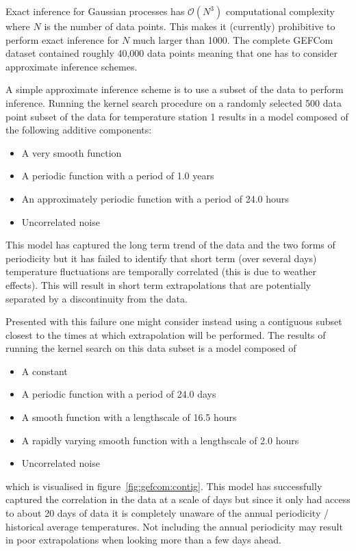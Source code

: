 Exact inference for Gaussian processes has $\mathcal{O}(N^3)$  computational complexity where $N$ is the number of data points.
This makes it (currently) prohibitive to perform exact inference for $N$ much larger than 1000.
The complete GEFCom dataset contained roughly 40,000 data points meaning that one has to consider approximate inference schemes.

A simple approximate inference scheme is to use a subset of the data to perform inference\citep[e.g.][]{Quinonero-Candela2005-er}.
Running the kernel search procedure on a randomly selected 500 data point subset of the data for temperature station 1 results in a model composed of the following additive components:
\begin{itemize}
  \item A very smooth function
  \item A periodic function with a period of 1.0 years
  \item An approximately periodic function with a period of 24.0 hours
  \item Uncorrelated noise
\end{itemize}
This model has captured the long term trend of the data and the two forms of periodicity but it has failed to identify that short term (over several days) temperature fluctuations are temporally correlated (this is due to weather effects).
This will result in short term extrapolations that are potentially separated by a discontinuity from the data.%

Presented with this failure one might consider instead using a contiguous subset closest to the times at which extrapolation will be performed.
The results of running the kernel search on this data subset is a model composed of
\begin{itemize}
  \item A constant
  \item A periodic function with a period of 24.0 days
  \item A smooth function with a lengthscale of 16.5 hours
  \item A rapidly varying smooth function with a lengthscale of 2.0 hours
  \item Uncorrelated noise
\end{itemize}
which is visualised in figure~\ref{fig:gefcom:contig}.
This model has successfully captured the correlation in the data at a scale of days but since it only had access to about 20 days of data it is completely unaware of the annual periodicity / historical average temperatures.
Not including the annual periodicity may result in poor extrapolations when looking more than a few days ahead.


